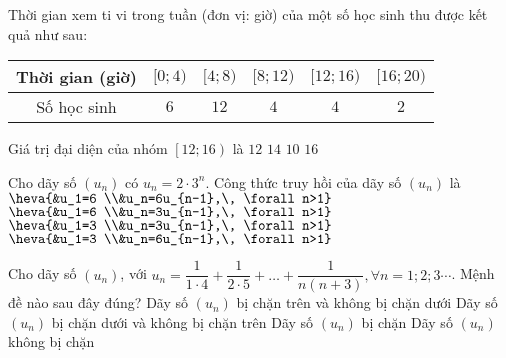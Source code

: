 \begin{ex}%
	Thời gian xem ti vi trong tuần (đơn vị: giờ) của một số học sinh thu được kết quả như sau:
	\begin{center}
	\begin{tabular}{|c|c|c|c|c|c|}
		\hline
		Thời gian (giờ)	& $[0;4)$ & $[4;8)$ & $[8;12)$ & $[12;16)$ & $[16;20)$ \\
		\hline
		Số học sinh	& $6$ & $12$ & $4$ & $4$ & $2$ \\
		\hline
	\end{tabular}
	\end{center}
	Giá trị đại diện của nhóm $\left[ 12;16 \right)$ là
	\choice
	{$12$}
	{\True $14$}
	{$10$}
	{$16$}
	\loigiai{
	Giá trị đại diện của nhóm $\left[ 12;16 \right)$ là $\dfrac{12+16}{2}=14$.
	}
\end{ex}

\begin{ex}%
	Cho dãy số $(u_n)$ có $u_n=2\cdot 3^n$. Công thức truy hồi của dãy số $(u_n)$ là 
	\choice
	{$\heva{&u_1=6	\\&u_n=6u_{n-1},\, \forall n>1}$}
	{\True $\heva{&u_1=6	\\&u_n=3u_{n-1},\, \forall n>1}$}
	{$\heva{&u_1=3	\\&u_n=3u_{n-1},\, \forall n>1}$}
	{$\heva{&u_1=3	\\&u_n=6u_{n-1},\, \forall n>1}$}
\end{ex}
\begin{ex}%
	Cho dãy số $\left(u_n\right)$, với $u_n=\dfrac{1}{1\cdot 4}+\dfrac{1}{2\cdot 5}+\ldots+\dfrac{1}{n(n+3)}, \forall n=1 ; 2 ; 3 \cdots$. Mệnh đề nào sau đây đúng?
	\choice
	{Dãy số $\left(u_n\right)$ bị chặn trên và không bị chặn dưới}
	{Dãy số $\left(u_n\right)$ bị chặn dưới và không bị chặn trên}
	{\True Dãy số $\left(u_n\right)$ bị chặn}
	{Dãy số $\left(u_n\right)$ không bị chặn}
\end{ex}

